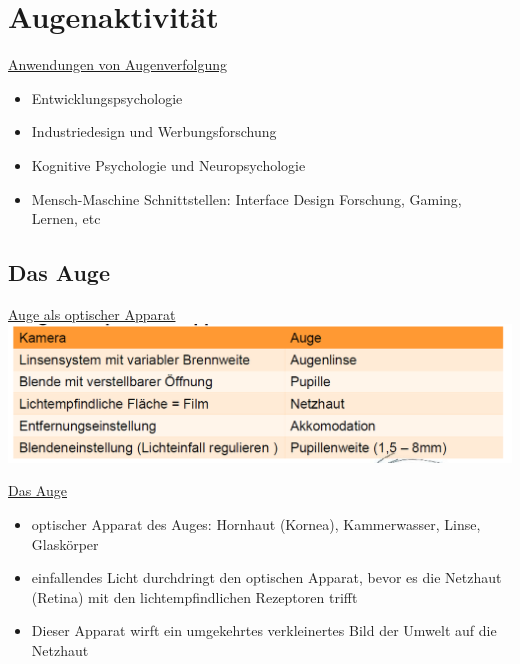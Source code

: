 \documentclass[a4paper,10pt,oneside]{article}
\begin{document}
	
\section{Augenaktivität}
\underline{Anwendungen von Augenverfolgung} \\
	\begin{itemize}
		\item Entwicklungspsychologie
		\item Industriedesign und Werbungsforschung
		\item Kognitive Psychologie und Neuropsychologie
		\item Mensch-Maschine Schnittstellen: Interface Design Forschung, Gaming, Lernen, etc
	\end{itemize}

\subsection{Das Auge}
\underline{Auge als optischer Apparat} \\
\includegraphics[scale=0.2]{Grafiken/2007.png}

\underline{Das Auge} \\
	\begin{itemize}
		\item optischer Apparat des Auges: Hornhaut (Kornea), Kammerwasser, Linse, Glaskörper
		\item einfallendes Licht durchdringt den optischen Apparat, bevor es die Netzhaut (Retina) mit den lichtempfindlichen Rezeptoren trifft
		\item Dieser Apparat wirft ein umgekehrtes verkleinertes Bild der Umwelt auf die Netzhaut
	\end{itemize}
	
\end{document}
